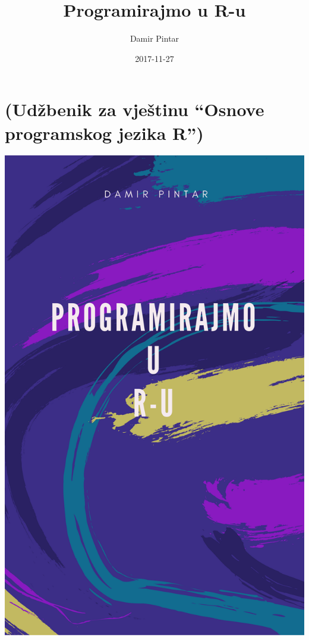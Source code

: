 \documentclass[]{book}
\title{Programirajmo u R-u}
\author{Damir Pintar}
\date{2017-11-27}
\theoremstyle{definition}
\theoremstyle{definition}
\theoremstyle{definition}
\theoremstyle{remark}
\begin{document}
\maketitle

{
\setcounter{tocdepth}{1}
\tableofcontents
}
\chapter*{\texorpdfstring{(Udžbenik za vještinu ``Osnove programskog
jezika
R'')}{(Udžbenik za vještinu Osnove programskog jezika R)}}\label{udzbenik-za-vjestinu-osnove-programskog-jezika-r}

\includegraphics{figures/proba.png}
\end{document}
